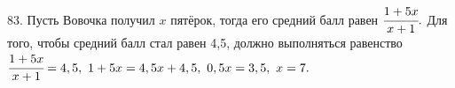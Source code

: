 83. Пусть Вовочка получил $x$ пятёрок, тогда его средний балл равен $\cfrac{1+5x}{x+1}.$ Для того, чтобы средний балл стал равен 4,5, должно выполняться равенство
$\cfrac{1+5x}{x+1}=4,5,\ 1+5x=4,5x+4,5,\ 0,5x=3,5,\ x=7.$\\
